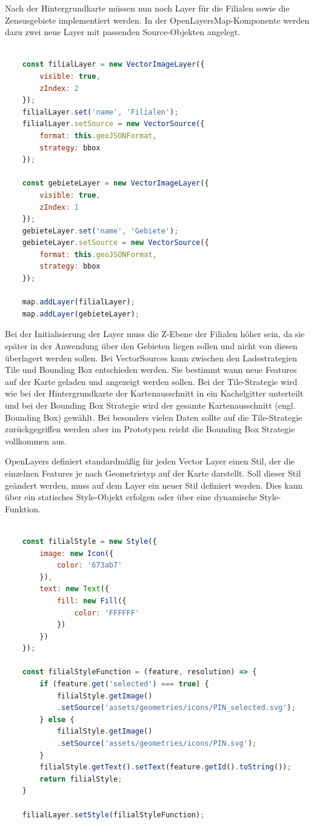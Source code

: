 Nach der Hintergrundkarte müssen nun noch Layer für die Filialen sowie die Zensusgebiete implementiert werden.
In der OpenLayersMap-Komponente werden dazu zwei neue Layer mit passenden Source-Objekten angelegt.

\begin{lstlisting}[language=JavaScript]

	const filialLayer = new VectorImageLayer({
		visible: true,
		zIndex: 2
	});	
	filialLayer.set('name', 'Filialen');
	filialLayer.setSource = new VectorSource({
		format: this.geoJSONFormat,
		strategy: bbox	
	});

	const gebieteLayer = new VectorImageLayer({
		visible: true,
		zIndex: 1
	});
	gebieteLayer.set('name', 'Gebiete');
	gebieteLayer.setSource = new VectorSource({
		format: this.geoJSONFormat,
		strategy: bbox	
	});

	map.addLayer(filialLayer);
	map.addLayer(gebieteLayer);
\end{lstlisting}

Bei der Initialisierung der Layer muss die Z-Ebene der Filialen höher sein, da sie später in der Anwendung über den Gebieten liegen sollen und nicht von diesen überlagert werden sollen.
Bei VectorSources kann zwischen den Ladestrategien Tile und Bounding Box entschieden werden.
Sie bestimmt wann neue Features auf der Karte geladen und angezeigt werden sollen.
Bei der Tile-Strategie wird wie bei der Hintergrundkarte der Kartenausschnitt in ein Kachelgitter unterteilt und bei der Bounding Box Strategie wird der gesamte Kartenausschnitt (engl. Bounding Box) gewählt. 
Bei besonders vielen Daten sollte auf die Tile-Strategie zurückgegriffen werden aber im Prototypen reicht die Bounding Box Strategie vollkommen aus.

OpenLayers definiert standardmäßig für jeden Vector Layer einen Stil, der die einzelnen Features je nach Geometrietyp auf der Karte darstellt. 
Soll dieser Stil geändert werden, muss auf dem Layer ein neuer Stil definiert werden.
Dies kann über ein statisches Style-Objekt erfolgen oder über eine dynamische Style-Funktion.

\begin{lstlisting}[language=JavaScript]
	
	const filialStyle = new Style({
		image: new Icon({
			color: '673ab7'
		}),
		text: new Text({
			fill: new Fill({
				color: 'FFFFFF'
			})	
		})
	});
	
	const filialStyleFunction = (feature, resolution) => {
		if (feature.get('selected') === true) {
			filialStyle.getImage()
			.setSource('assets/geometries/icons/PIN_selected.svg');
		} else {
			filialStyle.getImage()
			.setSource('assets/geometries/icons/PIN.svg');
		}
		filialStyle.getText().setText(feature.getId().toString());
		return filialStyle;
	}
	
	filialLayer.setStyle(filialStyleFunction);

	
\end{lstlisting}

